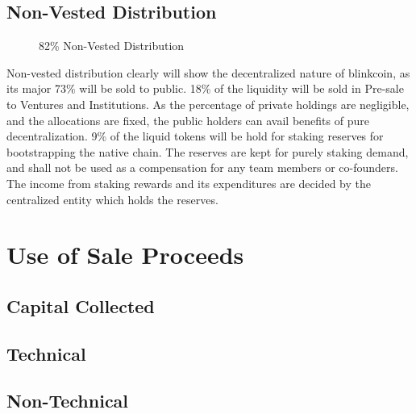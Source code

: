 \documentclass[a4paper,12pt]{article}
\begin{document}
\subsection{Non-Vested Distribution}

\begin{center}
\begin{figure}[H]
\centering
{}
\caption{82\% Non-Vested Distribution}
\end{figure}
\end{center}

Non-vested distribution clearly will show the decentralized nature of blinkcoin, as its major 73\% will be sold to public. 18\% of the liquidity will be sold in Pre-sale to Ventures and Institutions. As the percentage of private holdings are negligible, and the allocations are fixed, the public holders can avail benefits of pure decentralization. 9\% of the liquid tokens will be hold for staking reserves for bootstrapping the native chain. The reserves are kept for purely staking demand, and shall not be used as a compensation for any team members or co-founders. The income from staking rewards and its expenditures are decided by the centralized entity which holds the reserves.

\section{Use of Sale Proceeds}

\subsection{Capital Collected}

\subsection{Technical}

\subsection{Non-Technical}
\end{document}
